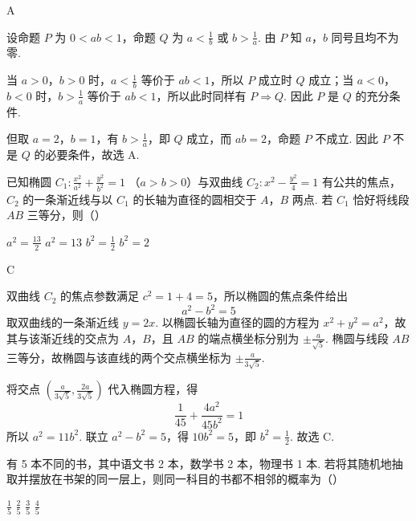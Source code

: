 \begin{answer}
A
\end{answer}

\begin{solution}
设命题 \(P\) 为 \(0<ab<1\)，命题 \(Q\) 为 \(a<\frac{1}{b}\) 或 \(b>\frac{1}{a}\). 由 \(P\) 知 \(a\)，\(b\) 同号且均不为零.

当 \(a>0\)，\(b>0\) 时，\(a<\frac{1}{b}\) 等价于 \(ab<1\)，所以 \(P\) 成立时 \(Q\) 成立；当 \(a<0\)，\(b<0\) 时，\(b>\frac{1}{a}\) 等价于 \(ab<1\)，所以此时同样有 \(P\Rightarrow Q\). 因此 \(P\) 是 \(Q\) 的充分条件.

但取 \(a=2\)，\(b=1\)，有 \(b>\frac{1}{a}\)，即 \(Q\) 成立，而 \(ab=2\)，命题 \(P\) 不成立. 因此 \(P\) 不是 \(Q\) 的必要条件，故选 A.
\end{solution}

\begin{problem}
已知椭圆 \(C_{1}: \frac{x^{2}}{a^{2}} + \frac{y^{2}}{b^{2}} = 1\) （\(a > b > 0\)）与双曲线 \(C_2:  x^{2} - \frac{y^{2}}{4} = 1\) 有公共的焦点，\(C_2\) 的一条渐近线与以 \(C_1\) 的长轴为直径的圆相交于 \(A\)，\(B\) 两点. 若 \(C_1\) 恰好将线段 \(AB\) 三等分，则（\quad）

\choices
    {\(a^2 = \frac{13}{2}\)}
    {\(a^2 = 13\)}
    {\(b^{2} = \frac{1}{2}\)}
    {\(b^{2} = 2\)}
\end{problem}

\begin{answer}
C
\end{answer}

\begin{solution}
双曲线 \(C_2\) 的焦点参数满足 \(c^2=1+4=5\)，所以椭圆的焦点条件给出
\[
a^2-b^2=5
\]
取双曲线的一条渐近线 \(y=2x\). 以椭圆长轴为直径的圆的方程为 \(x^2+y^2=a^2\)，故其与该渐近线的交点为 \(A\)，\(B\)，且 \(AB\) 的端点横坐标分别为 \(\pm\frac{a}{\sqrt{5}}\). 椭圆与线段 \(AB\) 三等分，故椭圆与该直线的两个交点横坐标为 \(\pm\frac{a}{3\sqrt{5}}\).

将交点 \(\left(\frac{a}{3\sqrt{5}},\frac{2a}{3\sqrt{5}}\right)\) 代入椭圆方程，得
\[
\frac{1}{45}+\frac{4a^2}{45b^2}=1
\]
所以 \(a^2=11b^2\). 联立 \(a^2-b^2=5\)，得 \(10b^2=5\)，即 \(b^2=\frac{1}{2}\). 故选 C.
\end{solution}

\begin{problem}
有 5 本不同的书，其中语文书 2 本，数学书 2 本，物理书 1 本. 若将其随机地抽取并摆放在书架的同一层上，则同一科目的书都不相邻的概率为（\quad）

\choices
    {\(\frac{1}{5}\)}
    {\(\frac{2}{5}\)}
    {\(\frac{3}{5}\)}
    {\(\frac{4}{5}\)}
\end{problem}

